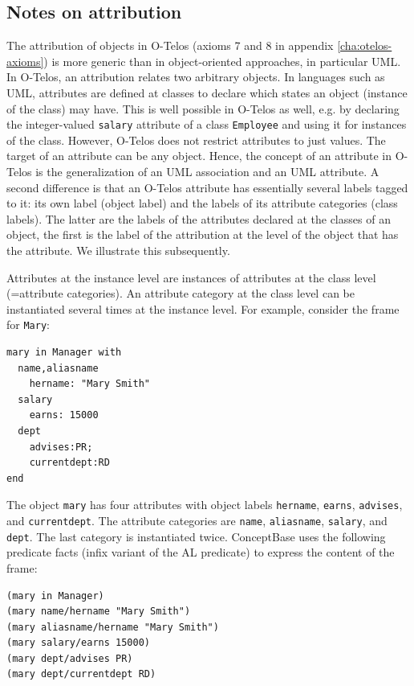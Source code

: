 \subsection{Notes on attribution}
The attribution of objects in O-Telos (axioms 7 and 8 in appendix \ref{cha:otelos-axioms})
is more generic than in object-oriented approaches,
in particular UML. In O-Telos, an attribution relates two arbitrary objects. In languages such as UML,
attributes are defined at classes to declare which states an object (instance of the class) may
have. This is well possible in O-Telos as well, e.g. by declaring the integer-valued {\tt salary} attribute
of a class {\tt Employee} and using it for instances of the class. However, O-Telos does not
restrict attributes to just values. The target of an attribute can be any object. Hence, the
concept of an attribute in O-Telos is the generalization of an UML association and an UML attribute.
A second difference is that an O-Telos attribute has essentially several labels tagged to it: its own
label (object label) and the labels of its attribute categories (class labels). 
The latter are the labels of the attributes declared
at the classes of an object, the first is the label of the attribution at the level of the object
that has the attribute. We illustrate this subsequently.

Attributes at the instance level are instances of attributes at the class level 
(=attribute categories). An attribute category at the class level can be instantiated
several times at the instance level. For example, consider the frame for {\tt Mary}:

\begin{verbatim}
mary in Manager with
  name,aliasname
    hername: "Mary Smith"
  salary
    earns: 15000
  dept
    advises:PR;
    currentdept:RD
end
\end{verbatim}

The object {\tt mary} has four attributes with object labels 
{\tt hername}, {\tt earns}, {\tt advises}, and {\tt current\-dept}.
The attribute categories are {\tt name}, {\tt aliasname}, {\tt salary}, and {\tt dept}. The last category
is instantiated twice. ConceptBase uses the following predicate facts (infix variant of the AL predicate)
to express the content of the frame:

\begin{verbatim}
(mary in Manager)
(mary name/hername "Mary Smith")
(mary aliasname/hername "Mary Smith")
(mary salary/earns 15000)
(mary dept/advises PR)
(mary dept/currentdept RD)
\end{verbatim}

